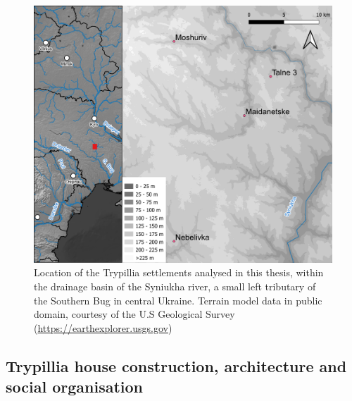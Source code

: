 \documentclass[
  12pt,
  a4paper, twoside]{book}
\begin{document}
\begin{figure}

{\centering \includegraphics[width=0.9\linewidth]{Results/fig03_trypillia} 

}

\caption[Map with location of Trypillia sites]{Location of the Trypillia settlements analysed in this thesis, within the drainage basin of the Syniukha river, a small left tributary of the Southern Bug in central Ukraine. Terrain model data in public domain, courtesy of the U.S Geological Survey (\url{https://earthexplorer.usgs.gov})}\label{fig:03-trypillia}
\end{figure}

\hypertarget{trypillia-house-construction-architecture-and-social-organisation}{%
\subsection{Trypillia house construction, architecture and social organisation}\label{trypillia-house-construction-architecture-and-social-organisation}}
\end{document}
